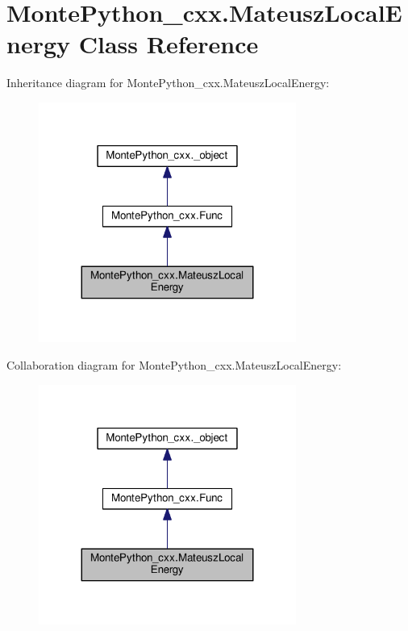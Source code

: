 \hypertarget{classMontePython__cxx_1_1MateuszLocalEnergy}{}\section{Monte\+Python\+\_\+cxx.\+Mateusz\+Local\+Energy Class Reference}
\label{classMontePython__cxx_1_1MateuszLocalEnergy}


Inheritance diagram for Monte\+Python\+\_\+cxx.\+Mateusz\+Local\+Energy\+:
\nopagebreak
\begin{figure}[H]
\begin{center}
\leavevmode
\includegraphics[width=239pt]{classMontePython__cxx_1_1MateuszLocalEnergy__inherit__graph}
\end{center}
\end{figure}


Collaboration diagram for Monte\+Python\+\_\+cxx.\+Mateusz\+Local\+Energy\+:
\nopagebreak
\begin{figure}[H]
\begin{center}
\leavevmode
\includegraphics[width=239pt]{classMontePython__cxx_1_1MateuszLocalEnergy__coll__graph}
\end{center}
\end{figure}
